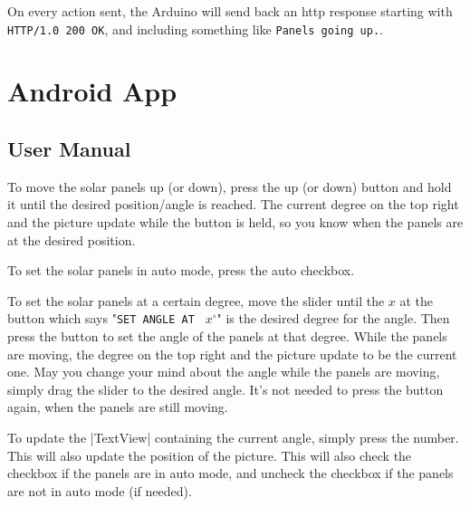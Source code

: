 \documentclass{article}
\begin{document}
			On every action sent, the Arduino will send back an http response starting with \verb|HTTP/1.0 200 OK|, and including something like \verb|Panels going up.|.
			
	\section{Android App}
		\subsection{User Manual}
			To move the solar panels up (or down), press the up (or down) button and hold it until the desired position/angle is reached. The current degree on the top right and the picture update while the button is held, so you know when the panels are at the desired position.
			
			To set the solar panels in auto mode, press the auto checkbox. 
			
			To set the solar panels at a certain degree, move the slider until the $x$ at the button which says "\verb|SET ANGLE AT | $x^{\circ}$" is the desired degree for the angle. Then press the button to set the angle of the panels at that degree. While the panels are moving, the degree on the top right and the picture update to be the current one. May you change your mind about the angle while the panels are moving, simply drag the slider to the desired angle. It's not needed to press the button again, when the panels are still moving.
			
			To update the |TextView| containing the current angle, simply press the number. This will also update the position of the picture. This will also check the checkbox if the panels are in auto mode, and uncheck the checkbox if the panels are not in auto mode (if needed).
		
\end{document}
